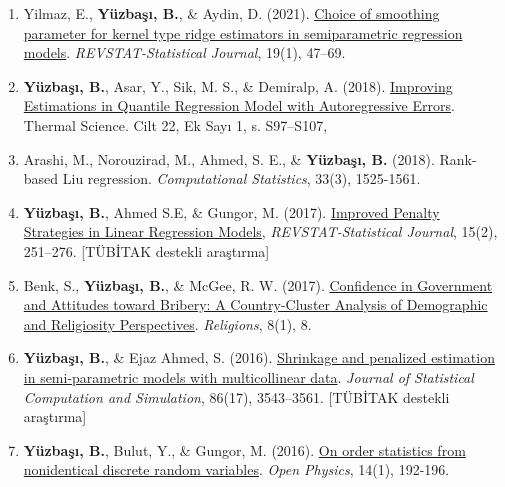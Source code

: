 \documentclass[10pt,a4paper]{article}
\newenvironment{etaremune}{\begin{enumerate}}{\end{enumerate}}
\newcommand{\JournalInfo}[2]{\hspace{0.3em}{\small\textsf{[#1; #2]}}}
\newcommand{\TubitakOutput}{{\small\textsf{[TÜBİTAK destekli araştırma]}}}
\begin{document}
\begin{etaremune}
\item
Yilmaz, E., {\bf Y\"{u}zba\c{s}{\i}, B.}, \& Aydin, D. (2021).
\href{https://www.ine.pt/revstat/pdf/REVSTAT-113-2017-R2.pdf}{ 
Choice of smoothing parameter for kernel type ridge estimators in semiparametric regression  models}. 
{\em REVSTAT-Statistical Journal}, 19(1), 47--69. \JournalInfo{SCIE}{Q2}


\item
{\bf Y\"{u}zba\c{s}{\i}, B.}, Asar, Y., Sik, M. S., \& Demiralp, A. (2018).  \href{http://thermalscience.vinca.rs/pdfs/papers-2018/TSCI170612275Y.pdf}{Improving Estimations in Quantile Regression Model with Autoregressive Errors}. Thermal Science. Cilt 22, Ek Sayı 1, s. S97--S107, \JournalInfo{SCIE}{Q4}




\item 
Arashi, M., Norouzirad, M., Ahmed, S. E., \& {\bf Y\"{u}zba\c{s}{\i}, B.} (2018). Rank-based Liu regression. {\em Computational Statistics}, 33(3), 1525-1561. \JournalInfo{SCIE}{Q2}


\item {\bf Y\"{u}zba\c{s}{\i}, B.}, Ahmed S.E, \& Gungor, M. (2017). 
\href{https://www.ine.pt/revstat/pdf/rs170205.pdf}{Improved Penalty Strategies in Linear Regression Models}, 
\emph{REVSTAT-Statistical Journal}, 15(2), 251--276. \JournalInfo{SCIE}{Q2; WoS/JCR 2025} \TubitakOutput
\label{by2017a}

 \item Benk, S., {\bf Y\"{u}zba\c{s}{\i}, B.}, \& McGee, R. W. (2017). 
\href{http://www.mdpi.com/2077-1444/8/1/8}{Confidence in Government and Attitudes toward Bribery: A Country-Cluster Analysis of Demographic and Religiosity Perspectives}. 
\emph{Religions}, 8(1), 8. \JournalInfo{AHCI}{Q1}
\label{by2017b}


\item {\bf Y\"{u}zba\c{s}{\i}, B.}, \& Ejaz Ahmed, S. (2016). 
\href{http://www.tandfonline.com/doi/abs/10.1080/00949655.2016.1171868?journalCode=gscs20}
{Shrinkage and penalized estimation in semi-parametric models with multicollinear data}. 
\emph{Journal of Statistical Computation and Simulation}, 86(17), 3543--3561. \JournalInfo{SCIE}{Q2} \TubitakOutput
\label{by2016a}

\item {\bf Y\"{u}zba\c{s}{\i}, B.}, Bulut, Y., \& Gungor, M. (2016). 
\href{https://www.degruyter.com/view/j/phys.2016.14.issue-1/phys-2016-0022/phys-2016-0022.xml}
{On order statistics from nonidentical discrete random variables}. 
\emph{Open Physics}, 14(1), 192-196. \JournalInfo{SCIE}{Q2}


\end{etaremune}
\end{document}
